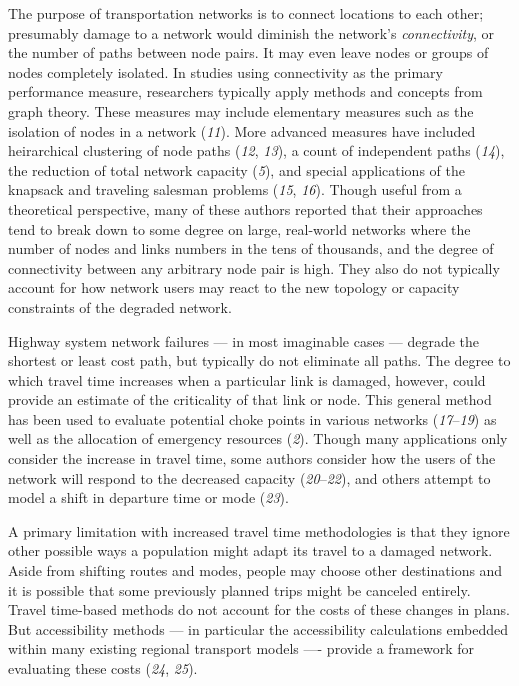 \documentclass[
  letterpaper,
]{trb}
\begin{document}
The purpose of transportation networks is to connect locations to each
other; presumably damage to a network would diminish the network's
\emph{connectivity}, or the number of paths between node pairs. It may
even leave nodes or groups of nodes completely isolated. In studies
using connectivity as the primary performance measure, researchers
typically apply methods and concepts from graph theory. These measures
may include elementary measures such as the isolation of nodes in a
network (\emph{11}). More advanced measures have included heirarchical
clustering of node paths (\emph{12}, \emph{13}), a count of independent
paths (\emph{14}), the reduction of total network capacity (\emph{5}),
and special applications of the knapsack and traveling salesman problems
(\emph{15}, \emph{16}). Though useful from a theoretical perspective,
many of these authors reported that their approaches tend to break down
to some degree on large, real-world networks where the number of nodes
and links numbers in the tens of thousands, and the degree of
connectivity between any arbitrary node pair is high. They also do not
typically account for how network users may react to the new topology or
capacity constraints of the degraded network.

Highway system network failures --- in most imaginable cases --- degrade
the shortest or least cost path, but typically do not eliminate all
paths. The degree to which travel time increases when a particular link
is damaged, however, could provide an estimate of the criticality of
that link or node. This general method has been used to evaluate
potential choke points in various networks (\emph{17}--\emph{19}) as
well as the allocation of emergency resources (\emph{2}). Though many
applications only consider the increase in travel time, some authors
consider how the users of the network will respond to the decreased
capacity (\emph{20}--\emph{22}), and others attempt to model a shift in
departure time or mode (\emph{23}).

A primary limitation with increased travel time methodologies is that
they ignore other possible ways a population might adapt its travel to a
damaged network. Aside from shifting routes and modes, people may choose
other destinations and it is possible that some previously planned trips
might be canceled entirely. Travel time-based methods do not account for
the costs of these changes in plans. But accessibility methods --- in
particular the accessibility calculations embedded within many existing
regional transport models ---- provide a framework for evaluating these
costs (\emph{24}, \emph{25}).
\end{document}
